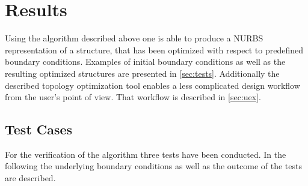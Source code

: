 \chapter{Results}
Using the algorithm described above one is able to produce a NURBS representation of a structure, that has been optimized with respect to predefined boundary conditions. Examples of initial boundary conditions as well as the resulting optimized structures are presented in \autoref{sec:tests}. Additionally the described topology optimization tool enables a less complicated design workflow from the user's point of view. That workflow is described in \autoref{sec:uex}.

\section{Test Cases}
\label{sec:tests}
For the verification of the algorithm three tests have been conducted. In the following the underlying boundary conditions as well as the outcome of the tests are described.

